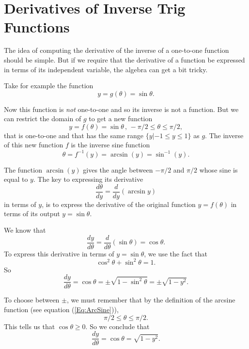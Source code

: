 \documentclass{ximera}
\begin{document}
\section{Derivatives of Inverse Trig Functions}

The idea of computing the derivative of the inverse of a one-to-one function should be simple. But if we require that the derivative of a function be expressed in terms of its independent variable, the algebra can get a bit tricky.

\begin{example} \label{Ecbfghnbng}
Take for example the function
\[
     y = g(\theta) = \sin\theta.
\]

Now this function is \emph{not} one-to-one and so its inverse is not a function. But we can restrict the domain of $g$ to get a new function
\begin{equation}  
     y =f(\theta) = \sin\theta \, , \, -\pi/2 \leq \theta \leq \pi/2 , \label{Eq:ArcSine}
\end{equation}
that is one-to-one and that has the same range $\{y | -1 \leq y \leq 1\}$ as $g$. The inverse of this new function $f$ is the inverse sine function
\[
    \theta = f^{-1}(y) = \arcsin(y) = \sin^{-1}(y) .
\]

The function $\arcsin (y)$ gives the angle between $-\pi/2$ and $\pi/2$ whose sine is equal to $y$. The key to expressing its derivative
\[
  \frac{d\theta}{dy} = \frac{d}{dy}\left(  \arcsin y \right)
\]
in terms of $y$, is to express the derivative of the original function $y=f(\theta)$ in terms of its output $y=\sin\theta$.

We know that
\[
     \frac{dy}{d\theta} = \frac{d}{d\theta} \left( \sin\theta \right) = \cos\theta .
\]
To express this derivative in terms of $y=\sin\theta$, we use the fact that 
\[
 \cos^2\theta + \sin^2\theta = 1 .
\]
So 
\[
      \frac{dy}{d\theta} = \cos\theta = \pm \sqrt{1-\sin^2\theta} = \pm \sqrt{1-y^2}.
\]

To choose between $\pm$, we must remember that by the definition of the arcsine function (see equation (\ref{Eq:ArcSine})), 
\[
   \pi/2 \leq \theta \leq \pi/2 .
\]
This tells us that $\cos\theta \geq 0$. So we conclude that
\[
\frac{dy}{d\theta} = \cos\theta = \sqrt{1-y^2}.
\]
\end{example}
\end{document}
